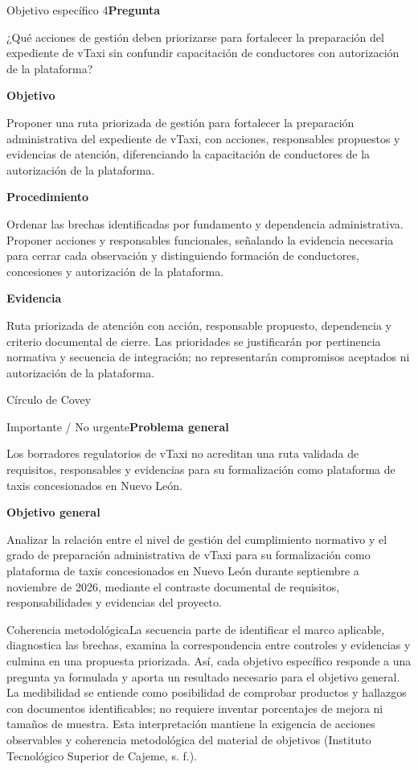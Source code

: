 \documentclass[aspectratio=169,11pt]{beamer}
\begin{document}
\begin{frame}{Objetivo específico 4}\small\textbf{Pregunta}\par ¿Qué acciones de gestión deben priorizarse para fortalecer la preparación del expediente de vTaxi sin confundir capacitación de conductores con autorización de la plataforma?\par\medskip\textbf{Objetivo}\par Proponer una ruta priorizada de gestión para fortalecer la preparación administrativa del expediente de vTaxi, con acciones, responsables propuestos y evidencias de atención, diferenciando la capacitación de conductores de la autorización de la plataforma.\par\medskip\textbf{Procedimiento}\par Ordenar las brechas identificadas por fundamento y dependencia administrativa. Proponer acciones y responsables funcionales, señalando la evidencia necesaria para cerrar cada observación y distinguiendo formación de conductores, concesiones y autorización de la plataforma.\par\medskip\textbf{Evidencia}\par Ruta priorizada de atención con acción, responsable propuesto, dependencia y criterio documental de cierre. Las prioridades se justificarán por pertinencia normativa y secuencia de integración; no representarán compromisos aceptados ni autorización de la plataforma.\end{frame}
\begin{frame}{Círculo de Covey}\small\begin{block}{Importante / No urgente}\textbf{Problema general}\par Los borradores regulatorios de vTaxi no acreditan una ruta validada de requisitos, responsables y evidencias para su formalización como plataforma de taxis concesionados en Nuevo León.\par\medskip\textbf{Objetivo general}\par Analizar la relación entre el nivel de gestión del cumplimiento normativo y el grado de preparación administrativa de vTaxi para su formalización como plataforma de taxis concesionados en Nuevo León durante septiembre a noviembre de 2026, mediante el contraste documental de requisitos, responsabilidades y evidencias del proyecto.\end{block}\end{frame}
\begin{frame}{Coherencia metodológica}\small La secuencia parte de identificar el marco aplicable, diagnostica las brechas, examina la correspondencia entre controles y evidencias y culmina en una propuesta priorizada. Así, cada objetivo específico responde a una pregunta ya formulada y aporta un resultado necesario para el objetivo general. La medibilidad se entiende como posibilidad de comprobar productos y hallazgos con documentos identificables; no requiere inventar porcentajes de mejora ni tamaños de muestra. Esta interpretación mantiene la exigencia de acciones observables y coherencia metodológica del material de objetivos (Instituto Tecnológico Superior de Cajeme, s. f.).\end{frame}
\end{document}

